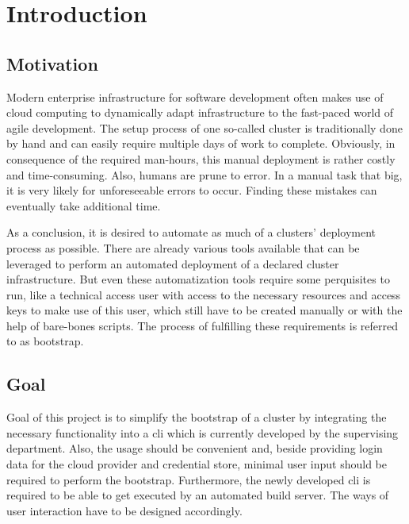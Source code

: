\chapter{Introduction}
\section{Motivation}
Modern enterprise infrastructure for software development often makes use of cloud computing to dynamically adapt infrastructure to the fast-paced world of agile development.
The setup process of one so-called cluster is traditionally done by hand and can easily require multiple days of work to complete.
Obviously, in consequence of the required man-hours, this manual deployment is rather costly and time-consuming.
Also, humans are prune to error.
In a manual task that big, it is very likely for unforeseeable errors to occur.
Finding these mistakes can eventually take additional time.

As a conclusion, it is desired to automate as much of a clusters' deployment process as possible.
There are already various tools available that can be leveraged to perform an automated deployment of a declared cluster infrastructure.
But even these automatization tools require some perquisites to run, like a technical access user with access to the necessary resources and access keys to make use of this user, which still have to be created manually or with the help of bare-bones scripts.
The process of fulfilling these requirements is referred to as bootstrap.

\section{Goal}
Goal of this project is to simplify the bootstrap of a cluster by integrating the necessary functionality into a \ac{cli} which is currently developed by the supervising department.
Also, the usage should be convenient and, beside providing login data for the cloud provider and credential store, minimal user input should be required to perform the bootstrap.
Furthermore, the newly developed \ac{cli} is required to be able to get executed by an automated build server.
The ways of user interaction have to be designed accordingly.

